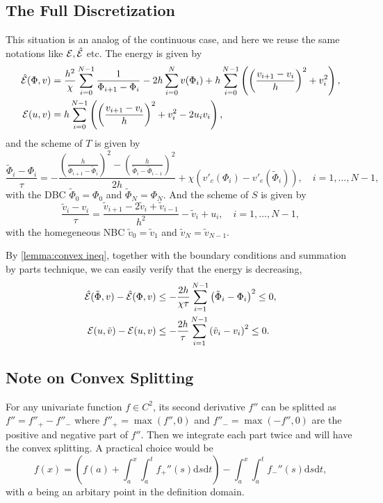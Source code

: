 \documentclass{article}
\def\diff{\mathrm d}
\begin{document}
\subsection{The Full Discretization}
This situation is an analog of the continuous case, and here we reuse the same notations
like $\mathcal E, \hat{\mathcal E}$ etc.
The energy is given by
\[
  \begin{aligned}
    \hat{\mathcal E}(\Phi, v)   & = \frac{h^2}\chi\sum_{i = 0}^{N - 1}\frac 1{\Phi_{i+1}-\Phi_i}
    - 2h\sum_{i = 0}^N v(\Phi_i)
    + h\sum_{i = 0}^{N-1} \left(\left(\frac{v_{i+1} - v_i}h\right)^2 + v_i^2\right),  \\
    \mathcal E(u, v) & = h\sum_{i = 0}^{N - 1}\left(
    \left(\frac{v_{i+1} - v_i}h\right)^2 + v_i^2 - 2u_iv_i
    \right),
  \end{aligned}
\]
and the scheme of $T$ is given by
\[
  \frac{\tilde\Phi_i - \Phi_i}{\tau} =
  -\frac{\left(\frac{h}{\tilde\Phi_{i+1} - \tilde\Phi_i}\right)^2
    -\left(\frac{h}{\tilde\Phi_{i} - \tilde\Phi_{i-1}}\right)^2}{2h}
  +\chi\left(v'_c(\Phi_i) - v'_e(\tilde\Phi_i)\right),
  \quad i = 1,\ldots, N-1,
\]
with the DBC $\tilde\Phi_0 = \Phi_0$ and $\tilde\Phi_N = \Phi_N$.
And the scheme of $S$ is given by
\[
  \frac{\tilde v_i -v_i}{\tau} =
  \frac{\tilde v_{i+1} - 2\tilde v_i + \tilde v_{i-1}}{h^2}
  - \tilde v_i + u_i,
  \quad i = 1,\ldots, N-1,
\]
with the homegeneous NBC $\tilde v_0 = \tilde v_1$ and $\tilde v_N = \tilde v_{N - 1}$.

By \cref{lemma:convex ineq}, together with the boundary conditions and summation by
parts technique, we can easily verify that the energy is decreasing,
\[\begin{aligned}
    \hat{\mathcal E}(\tilde\Phi, v) - \hat{\mathcal E}(\Phi, v)
    &\leq -\frac{2h}{\chi\tau}\sum_{i = 1}^{N-1}\left(\tilde\Phi_i - \Phi_i\right)^2
    \leq 0, \\
    \mathcal E(u, \tilde v) - \mathcal E(u, v)
    &\leq -\frac{2h}{\tau}\sum_{i = 1}^{N-1}\left(\tilde v_i - v_i\right)^2
    \leq 0.
  \end{aligned}\]

\subsection{Note on Convex Splitting}
For any univariate function $f\in C^2$, its second derivative $f''$ can be
splitted as $f'' = f''_+ - f''_-$ where $f''_+ = \max(f'', 0)$ and $f''_- = \max(-f'', 0)$ 
are the positive and negative part of $f''$.
Then we integrate each part twice and will have the convex splitting.
A practical choice would be
\[
  f(x) = 
  \left(f(a) + \int_a^x\int_a^t f_+''(s)\diff s\diff t\right)
  - \int_a^x\int_a^t f_-''(s)\diff s\diff t,
\]
with $a$ being an arbitary point in the definition domain.
\end{document}
